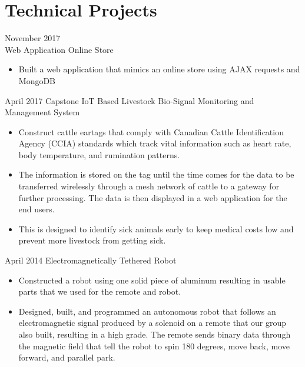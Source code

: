 \documentclass[]{friggeri-cv} %
\begin{document}
\section{Technical Projects}

\begin{entrylist}

\entry
{November 2017\\}
  {Web Application {\normalfont Online Store}}
{}
{
\begin{itemize}
\item Built a web application that mimics an online store using AJAX requests
and MongoDB
\end{itemize}
}
\entry
{April 2017}
{Capstone {\normalfont IoT Based Livestock Bio-Signal Monitoring and Management System}}
{}
{
\begin{itemize}
\item Construct cattle eartags that comply with Canadian Cattle Identification
Agency (CCIA) standards which track vital information such as heart rate, body
temperature, and rumination patterns.
\item The information is stored on the tag until the time comes for the
data to be transferred wirelessly through a mesh network of cattle to a gateway
for further processing. The data is then displayed in a web application for the
end users.
\item This is designed to identify sick animals early to keep medical costs low
and prevent more livestock from getting sick.
\end{itemize}
}
\entry
{April 2014}
{Electromagnetically Tethered Robot}
{}
{
\begin{itemize}
\item Constructed a robot using one solid piece of aluminum resulting in usable
parts that we used for the remote and robot.
\item Designed, built, and programmed an autonomous robot that follows an
electromagnetic signal produced by a
solenoid on a remote that our group also built, resulting in a high grade. The
remote sends binary data through
the magnetic field that tell the robot to spin 180 degrees, move back, move
forward, and parallel park.
\end{itemize}
}
\end{entrylist}

\end{document}
